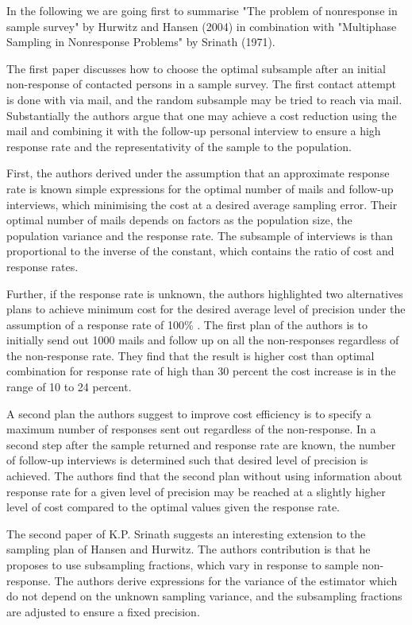 In the following we are going first to summarise "The problem of nonresponse in sample survey" by Hurwitz and Hansen (2004) in combination with "Multiphase Sampling in Nonresponse Problems" by Srinath (1971). \par
The first paper discusses how to choose the optimal subsample after an initial non-response of contacted persons in a sample survey. The first contact attempt is done with via mail, and the random subsample may be tried to reach via mail. 
 Substantially the authors argue that one may achieve a cost reduction using the mail and combining it with the follow-up personal interview to ensure a high response rate and the representativity of the sample to the population. \par 
First, the authors derived under the assumption that an approximate response rate is known simple expressions for the optimal number of mails and follow-up interviews, which minimising the cost at a desired average sampling error. Their optimal number of mails depends on factors as the population size, the population variance and the response rate. The subsample of interviews is than proportional to the inverse of the constant, which contains the ratio of cost and response rates. \par
Further,  if the response rate is unknown, the authors highlighted two alternatives plans to achieve minimum cost for the desired average level of precision under the assumption of a response rate of 100\% . The first plan of the authors is to initially send out 1000 mails and follow up on all the non-responses regardless of the non-response rate. They find that
the result is higher cost than optimal combination for response rate of high than 30 percent the cost increase is in the range of 10 to 24 percent. \par
A second plan the authors suggest to improve cost efficiency is to specify a maximum number of responses sent out regardless of the non-response. In a second step after the sample returned and response rate are known,  the number of follow-up interviews is determined such that desired level of precision is achieved. 
The authors find that the second plan without using information about response rate for a given level of precision may be reached at a slightly higher level of cost compared to the optimal values given the response rate.  \par
The second paper of K.P. Srinath suggests an interesting extension to the sampling plan of Hansen and Hurwitz. The authors contribution is that he proposes to use subsampling fractions, which vary in response to sample non-response. The authors derive expressions for the variance of the estimator which do not depend on the unknown sampling variance, and the subsampling fractions are adjusted to ensure a fixed precision.  
